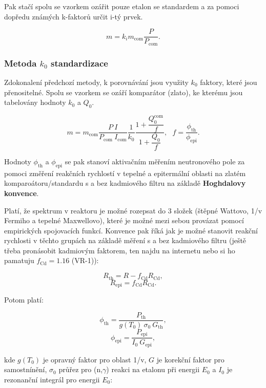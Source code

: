 Pak stačí spolu se vzorkem ozářit pouze etalon se standardem a za pomoci dopředu známých k-faktorů určit i-tý prvek.

\begin{equation}
    \boxed{
        m = k_i m_\text{com} \dfrac{P}{P_\text{com}}.
    }
\end{equation}

\subsubsection{Metoda $k_0$ standardizace}

Zdokonalení předchozí metody, k porovnávání jsou využity $k_0$ faktory, které jsou přenositelné. Spolu se vzorkem se ozáří komparátor (zlato), ke kterému jsou tabelovány hodnoty $k_0$ a $Q_0$.

\begin{equation}
    \boxed{
        m = m_\text{com} \dfrac{P \: I}{P_\text{com} \: I_\text{com}} \dfrac{1}{k_0} \dfrac{1 + \dfrac{Q_0^\text{com}}{f}}{1 + \dfrac{Q_0}{f}}, \: \: \: f = \dfrac{\phi_\text{th}}{\phi_\text{epi}}.
    }
\end{equation}

Hodnoty $\phi_\text{th}$ a $\phi_\text{epi}$ se pak stanoví aktivačním měřením neutronového pole za pomoci změření reakčních rychlostí v tepelné a epitermální oblasti na zlatém komparoátoru/standardu s a bez kadmiového filtru na základě \textbf{Hoghdalovy konvence}.

Platí, že spektrum v reaktoru je možné rozepsat do 3 složek (štěpné Wattovo, 1/v Fermiho a tepelné Maxwellovo), které je možné mezi sebou provázat pomocí empirických spojovacích funkcí. Konvence pak říká jak je možné stanovit reakční rychlosti v těchto grupách na základě měření s a bez kadmiového filtru (ještě třeba pronásobit kadmiovým faktorem, ten najdu na internetu nebo si ho pamatuju $f_\text{Cd}=1.16$ (VR-1)):

$$ R_\text{th} = R - f_\text{Cd}R_\text{Cd}, $$
$$ R_\text{epi} = f_\text{Cd}R_\text{Cd}. $$

Potom platí:

$$ \phi_\text{th} = \dfrac{P_\text{th}}{g(T_0) \: \sigma_0 \: G_\text{th}}, $$
$$ \phi_\text{epi} = \dfrac{P_\text{epi}}{I_0 \: G_\text{epi}}, $$

kde $g(T_0)$ je opravný faktor pro oblast 1/v, $G$ je korekční faktor pro samostnínění, $\sigma_0$ průřez pro (n,$\gamma$) reakci na etalonu při energii $E_0$ a $I_0$ je rezonanční integrál pro energii $E_0$:

